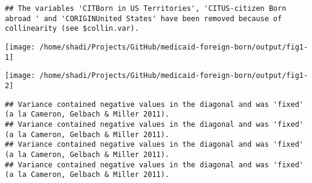 \documentclass[
]{article}
\begin{document}
\begin{verbatim}
## The variables 'CITBorn in US Territories', 'CITUS-citizen Born abroad ' and 'CORIGINUnited States' have been removed because of collinearity (see $collin.var).
\end{verbatim}

\begin{center}\texttt{[image: /home/shadi/Projects/GitHub/medicaid-foreign-born/output/fig1-1]} \end{center}

\begin{center}\texttt{[image: /home/shadi/Projects/GitHub/medicaid-foreign-born/output/fig1-2]} \end{center}
\FloatBarrier

\begin{verbatim}
## Variance contained negative values in the diagonal and was 'fixed' (a la Cameron, Gelbach & Miller 2011).
## Variance contained negative values in the diagonal and was 'fixed' (a la Cameron, Gelbach & Miller 2011).
## Variance contained negative values in the diagonal and was 'fixed' (a la Cameron, Gelbach & Miller 2011).
## Variance contained negative values in the diagonal and was 'fixed' (a la Cameron, Gelbach & Miller 2011).
\end{verbatim}
\end{document}
